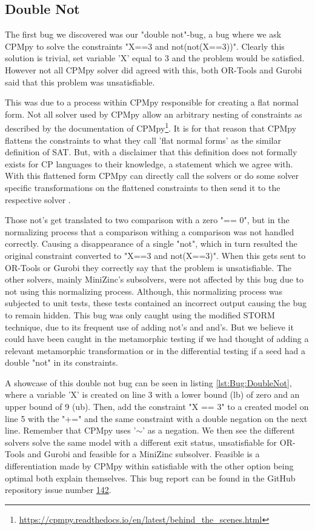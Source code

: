 \subsection{Double Not}
\label{res:bug:DoubleNot}
The first bug we discovered was our "double not"-bug, a bug where we ask CPMpy to solve the constraints "X==3 and not(not(X==3))". Clearly this solution is trivial, set variable 'X' equal to 3 and the problem would be satisfied. However not all CPMpy solver did agreed with this, both OR-Tools and Gurobi said that this problem was unsatisfiable. 

This was due to a process within CPMpy responsible for creating a flat normal form. Not all solver used by CPMpy allow an arbitrary nesting of constraints as described by the documentation of CPMpy\footnote{\url{https://cpmpy.readthedocs.io/en/latest/behind_the_scenes.html}}. It is for that reason that CPMpy flattens the constraints to what they call 'flat normal forms' as the similar definition of SAT. But, with a disclaimer that this definition does not formally exists for CP languages to their knowledge, a statement which we agree with. With this flattened form CPMpy can directly call the solvers or do some solver specific transformations on the flattened constraints to then send it to the respective solver \cite{CPMpyGithub}. 

Those not's get translated to two comparison with a zero "== 0", but in the normalizing process that a comparison withing a comparison was not handled correctly. Causing a disappearance of a single "not", which in turn resulted the original constraint converted to "X==3 and not(X==3)". When this gets sent to OR-Tools or Gurobi they correctly say that the problem is unsatisfiable. The other solvers, mainly MiniZinc's subsolvers, were not affected by this bug due to not using this normalizing process. Although, this normalizing process was subjected to unit tests, these tests contained an incorrect output causing the bug to remain hidden. This bug was only caught using the modified STORM technique, due to its frequent use of adding not's and and's. But we believe it could have been caught in the metamorphic testing if we had thought of adding a relevant metamorphic transformation or in the differential testing if a seed had a double "not" in its constraints. 

A showcase of this double not bug can be seen in listing \ref{lst:Bug:DoubleNot}, where a variable 'X' is created on line 3 with a lower bound (lb) of zero and an upper bound of 9 (ub). Then, add the constraint "X == 3" to a created model on line 5 with the "+=" and the same constraint with a double negation on the next line. Remember that CPMpy uses '$\sim$' as a negation. We then see the different solvers solve the same model with a different exit status, unsatisfiable for OR-Tools and Gurobi and feasible for a MiniZinc subsolver. Feasible is a differentiation made by CPMpy within satisfiable with the other option being optimal both explain themselves. This bug report can be found in the GitHub repository issue number \href{https://github.com/CPMpy/cpmpy/issues/142}{142}.

